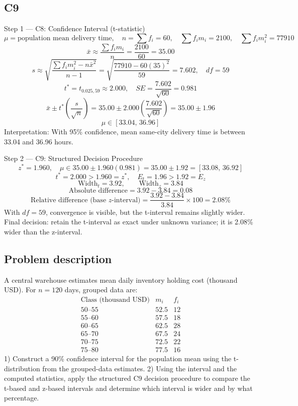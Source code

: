 \begin{ExamProblems}
		\subsection*{C9}
		Step 1 --- C8: Confidence Interval (t-statistic)
		\[
		\mu=\text{population mean delivery time},\quad n=\sum f_i=60,\quad \sum f_im_i=2100,\quad \sum f_im_i^2=77910
		\]
		\[
		\bar{x}\approx\frac{\sum f_im_i}{n}=\frac{2100}{60}=35.00
		\]
		\[
		s\approx\sqrt{\frac{\sum f_im_i^2-n\bar{x}^2}{n-1}}=\sqrt{\frac{77910-60(35)^2}{59}}=7.602,\quad df=59
		\]
		\[
		t^*=t_{0.025,59}\approx 2.000,\quad SE=\frac{7.602}{\sqrt{60}}=0.981
		\]
		\[
		\bar{x}\pm t^*\left(\frac{s}{\sqrt{n}}\right)=35.00\pm 2.000\left(\frac{7.602}{\sqrt{60}}\right)=35.00\pm 1.96
		\]
		\[
		\mu\in[33.04,\,36.96]
		\]
		Interpretation: With 95\% confidence, mean same-city delivery time is between 33.04 and 36.96 hours.

		Step 2 --- C9: Structured Decision Procedure
		\[
		z^*=1.960,\quad \mu\in 35.00\pm 1.960(0.981)=35.00\pm 1.92=[33.08,\,36.92]
		\]
		\[
		t^*=2.000>1.960=z^*,\quad E_t=1.96>1.92=E_z
		\]
		\[
		\text{Width}_t=3.92,\qquad \text{Width}_z=3.84
		\]
		\[
		\text{Absolute difference}=3.92-3.84=0.08
		\]
		\[
		\text{Relative difference (base }z\text{-interval)}=\frac{3.92-3.84}{3.84}\times 100=2.08\%
		\]
		With $df=59$, convergence is visible, but the t-interval remains slightly wider.
		Final decision: retain the t-interval as exact under unknown variance; it is 2.08\% wider than the z-interval.

		\newpage
		\item
		\subsection*{Problem description}
		A central warehouse estimates mean daily inventory holding cost (thousand USD).
		For $n=120$ days, grouped data are:
		\[
		\begin{array}{c|c|c}
		\text{Class (thousand USD)} & m_i & f_i\\\hline
		50\text{--}55 & 52.5 & 12\\
		55\text{--}60 & 57.5 & 18\\
		60\text{--}65 & 62.5 & 28\\
		65\text{--}70 & 67.5 & 24\\
		70\text{--}75 & 72.5 & 22\\
		75\text{--}80 & 77.5 & 16
		\end{array}
		\]
		1) Construct a 90\% confidence interval for the population mean using the t-distribution from the grouped-data estimates.
		2) Using the interval and the computed statistics, apply the structured C9 decision procedure to compare the t-based and z-based intervals and determine which interval is wider and by what percentage.


\end{ExamProblems}
